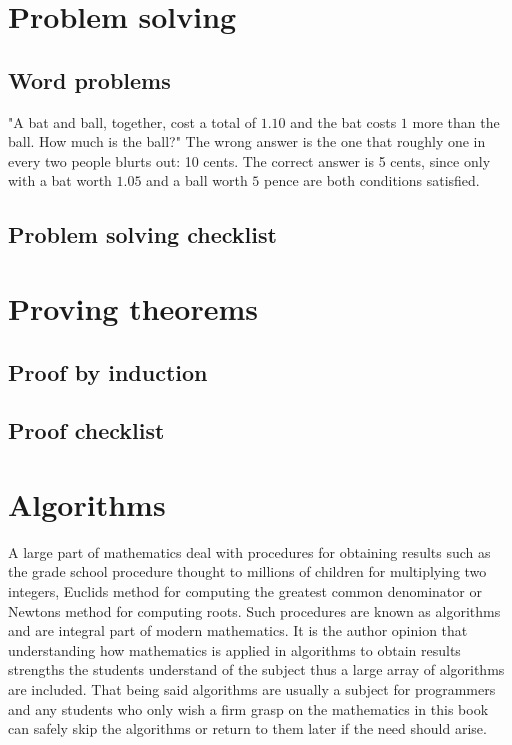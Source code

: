 \section{Problem solving}
\subsection{Word problems}
"A bat and ball, together, cost a total of $1.10$ and the bat costs $1$ more than the ball. How much is the ball?" The wrong answer is the one that roughly one in every two people blurts out: 10 cents. The correct answer is 5 cents, since only with a bat worth $1.05$ and a ball worth $5$ pence are both conditions satisfied.

\subsection{Problem solving checklist}

\section{Proving theorems}
\subsection{Proof by induction}
\subsection{Proof checklist}

\section{Algorithms}
A large part of mathematics deal with procedures for obtaining results such as the grade school procedure thought to millions of children for multiplying two integers, Euclids method for computing the greatest common denominator or Newtons method for computing roots. Such procedures are known as algorithms and are integral part of modern mathematics. It is the author opinion that understanding how mathematics is applied in algorithms to obtain results strengths the students understand of the subject thus a large array of algorithms are included. That being said algorithms are usually a subject for programmers and any students who only wish a firm grasp on the mathematics in this book can safely skip the algorithms or return to them later if the need should arise.

